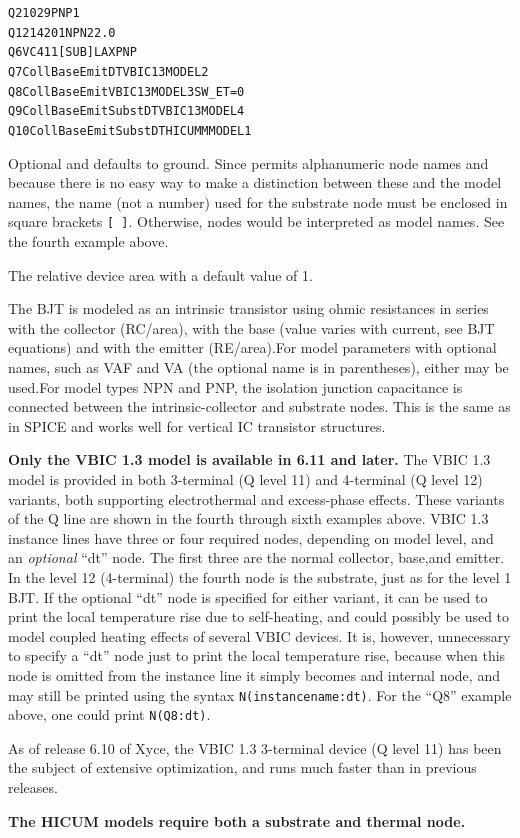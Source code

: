 \begin{Device}
\examples
\begin{alltt}
Q2 10 2 9 PNP1
Q12 14 2 0 1 NPN2 2.0
Q6 VC 4 11 [SUB] LAXPNP
Q7 Coll Base Emit DT VBIC13MODEL2
Q8 Coll Base Emit VBIC13MODEL3 SW\_ET=0
Q9 Coll Base Emit Subst DT VBIC13MODEL4
Q10 Coll Base Emit Subst DT HICUMMMODEL1
\end{alltt}

\parameters
\begin{Parameters}
  Optional and defaults to ground. Since \Xyce{} permits alphanumeric
  node names and because there is no easy way to make a distinction between
  these and the model names, the name (not a number) used for the substrate
  node must be enclosed in square brackets \texttt{[ ]}.  Otherwise, nodes
  would be interpreted as model names. See the fourth example above.

  The relative device area with a default value of 1.

\end{Parameters}

\comments
The BJT is modeled as an intrinsic transistor using ohmic resistances in series
with the collector (RC/area), with the base (value varies with current, see BJT
equations) and with the emitter (RE/area).For model parameters with optional
names, such as VAF and VA (the optional name is in parentheses), either may be
used.For model types NPN and PNP, the isolation junction capacitance is
connected between the intrinsic-collector and substrate nodes. This is the same
as in SPICE and works well for vertical IC transistor structures.

\textbf{Only the VBIC 1.3 model is available in \Xyce{} 6.11 and
  later.}  The VBIC 1.3 model is provided in both 3-terminal (Q level
  11) and 4-terminal (Q level 12) variants, both supporting
  electrothermal and excess-phase effects.  These variants of the Q line
  are shown in the fourth through sixth examples above. VBIC 1.3
  instance lines have three or four required nodes, depending on model
  level, and an \emph{optional} ``dt'' node.  The first three are the
  normal collector, base,and emitter. In the level 12 (4-terminal) the
  fourth node is the substrate, just as for the level 1 BJT.  If the
  optional ``dt'' node is specified for either variant, it can be used
  to print the local temperature rise due to self-heating, and could
  possibly be used to model coupled heating effects of several VBIC
  devices.  It is, however, unnecessary to specify a ``dt'' node just
  to print the local temperature rise, because when this node is
  omitted from the instance line it simply becomes and internal node,
  and may still be printed using the syntax
  \texttt{N(instancename:dt)}.  For the ``Q8'' example above, one
  could print \texttt{N(Q8:dt)}.

As of release 6.10 of Xyce, the VBIC 1.3 3-terminal device (Q level
11) has been the subject of extensive optimization, and runs much
faster than in previous releases.

\textbf{ The HICUM models require both a substrate and thermal node.}

\end{Device}


